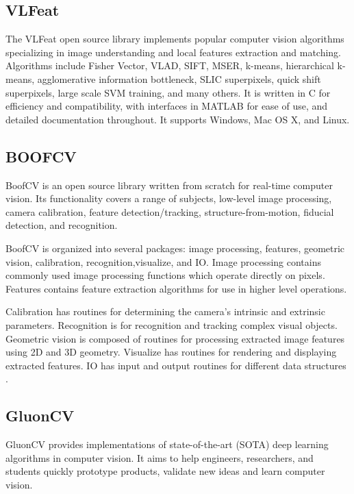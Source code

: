     \subsection{VLFeat}

    The VLFeat open source library implements popular computer vision algorithms specializing in image understanding and local features extraction and matching. Algorithms include Fisher Vector, VLAD, SIFT, MSER, k-means, hierarchical k-means, agglomerative information bottleneck, SLIC superpixels, quick shift superpixels, large scale SVM training, and many others. It is written in C for efficiency and compatibility, with interfaces in MATLAB for ease of use, and detailed documentation throughout. It supports Windows, Mac OS X, and Linux. \cite{vedaldi08vlfeat}

    \subsection{BOOFCV}

    BoofCV is an open source library written from scratch for real-time computer vision. Its functionality covers a range of subjects, low-level image processing, camera calibration, feature detection/tracking, structure-from-motion, fiducial detection, and recognition. \par
	BoofCV is organized into several packages: image processing, features, geometric vision, calibration, recognition,visualize, and IO. Image processing contains commonly used image processing functions which operate directly on pixels. Features contains feature extraction algorithms for use in higher level operations. \par Calibration has routines for determining the camera's intrinsic and extrinsic parameters. Recognition is for recognition and tracking complex visual objects. Geometric vision is composed of routines for processing extracted image features using 2D and 3D geometry. Visualize has routines for rendering and displaying extracted features. IO has input and output routines for different data structures \cite{boofcvweb}.

    \subsection{GluonCV}

    GluonCV provides implementations of state-of-the-art (SOTA) deep learning algorithms in computer vision. It aims to help engineers, researchers, and students quickly prototype products, validate new ideas and learn computer vision. \cite{Guo2019}

